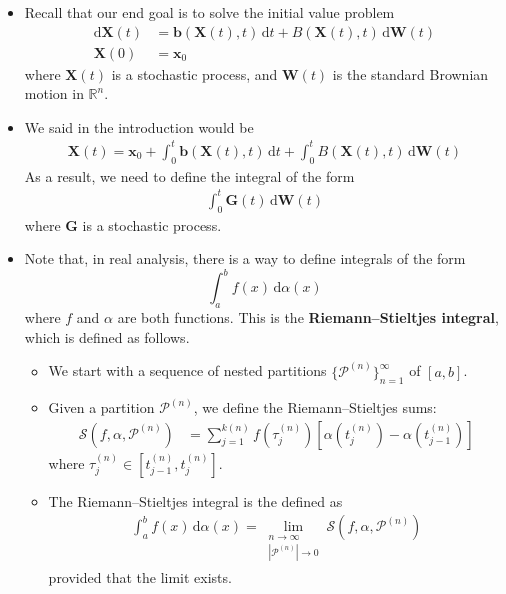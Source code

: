 \documentclass[10pt]{article}
\newcommand{\dee}{\mathrm{d}}
\newcommand{\ve}[1]{\mathbf{#1}}
\newcommand{\mcal}[1]{\mathcal{#1}}
\newcommand{\Real}{\mathbb{R}}
\begin{document}
\begin{itemize}
  \item Recall that our end goal is to solve the initial value problem
  \begin{align*}
    \dee\ve{X}(t) &= \ve{b}(\ve{X}(t), t)\, \dee t + B(\ve{X}(t), t)\, \dee\ve{W}(t) \\
    \ve{X}(0) &= \ve{x}_0
  \end{align*}
  where $\ve{X}(t)$ is a stochastic process, and $\ve{W}(t)$ is the standard Brownian motion in $\Real^n$.

  \item We said in the introduction would be
  \begin{align*}
    \ve{X}(t) = \ve{x}_0 + \int_0^t \ve{b}(\ve{X}(t), t)\, \dee t + \int_0^t B(\ve{X}(t), t)\, \dee\ve{W}(t)
  \end{align*}
  As a result, we need to define the integral of the form
  \begin{align*}
    \int_0^t \ve{G}(t)\, \dee\ve{W}(t)
  \end{align*}
  where $\ve{G}$ is a stochastic process.

  \item Note that, in real analysis, there is a way to define integrals of the form $$\int_a^b f(x)\, \dee \alpha(x)$$ where $f$ and $\alpha$ are both functions. This is the {\bf Riemann--Stieltjes integral}, which is defined as follows.
  
  \begin{itemize}
    \item We start with a sequence of nested partitions $\{ \mcal{P}^{(n)} \}_{n=1}^\infty$ of $[a,b]$.
    
    \item Given a partition $\mcal{P}^{(n)}$, we define the Riemann--Stieltjes sums: 
    \begin{align*}
      \mcal{S}(f, \alpha, \mcal{P}^{(n)}) &= \sum_{j=1}^{k(n)} f(\tau_j^{(n)}) [\alpha(t_j^{(n)}) - \alpha(t_{j-1}^{(n)})]
    \end{align*}
    where $\tau_j^{(n)} \in [t_{j-1}^{(n)}, t_{j}^{(n)}]$.
    
    \item The Riemann--Stieltjes integral is the defined as
    \begin{align*}
      \int_a^b f(x)\, \dee\alpha(x) = \lim_{\substack{ n \rightarrow \infty \\ |\mcal{P}^{(n)}| \rightarrow 0 }} \mcal{S}(f, \alpha, \mcal{P}^{(n)})
    \end{align*}
    provided that the limit exists.
  \end{itemize}


\end{itemize}
\end{document}
